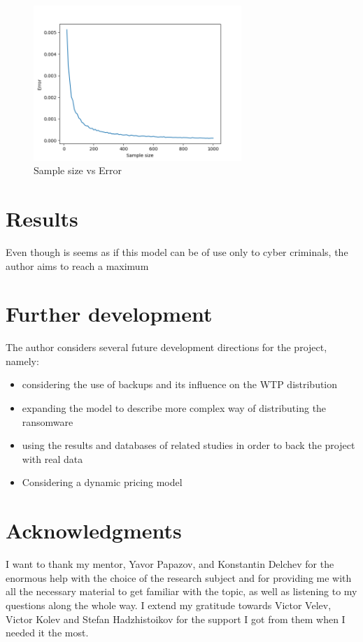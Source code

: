 \documentclass[11pt, a4paper]{article}
\theoremstyle{definition}
\begin{document}
		\begin{figure}[H]
		\begin{minipage}{1.0\textwidth}
			\centering
			\includegraphics[width=0.7\textwidth]{"Error vs sample size 4"}
			\caption{Sample size vs Error}\label{Fig:Data5}
		\end{minipage}
		\end{figure}
				
\section{Results}
	Even though is seems as if this model can be of use only to cyber criminals, the author aims to reach a maximum
\section{Further development}
	The author considers several future development directions for the project, namely:
	\begin{itemize}
		\item considering the use of backups and its influence on the WTP distribution
		\item expanding the model to describe more complex way of distributing the ransomware
		\item using the results and databases of related studies in order to back the project with real data\cite{paquet2019ransomware}
		\item Considering a dynamic pricing model
	\end{itemize}
\section{Acknowledgments}
I want to thank my mentor, Yavor Papazov, and Konstantin Delchev for the enormous help with the choice of the research subject and for providing me with all the necessary material to get familiar with the topic, as well as listening to my questions along the whole way. I extend my gratitude towards Victor Velev, Victor Kolev and Stefan Hadzhistoikov for the support I got from them when I needed it the most.
\nocite{*}


\end{document}
